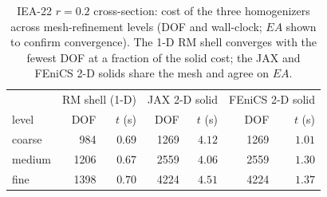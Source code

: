 \begin{table}[t]\centering\small
\caption{IEA-22 $r=0.2$ cross-section: cost of the three homogenizers across mesh-refinement levels (DOF and wall-clock; $EA$ shown to confirm convergence). The 1-D RM shell converges with the fewest DOF at a fraction of the solid cost; the JAX and FEniCS 2-D solids share the mesh and agree on $EA$.}\label{tab:timing}
\setlength{\tabcolsep}{5pt}
\begin{tabular}{l|rr|rr|rr}
\toprule
& \multicolumn{2}{c|}{RM shell (1-D)} & \multicolumn{2}{c|}{JAX 2-D solid} & \multicolumn{2}{c}{FEniCS 2-D solid}\\
level & DOF & $t$ (s) & DOF & $t$ (s) & DOF & $t$ (s)\\
\midrule
coarse & 984 & $0.69$ & 1269 & $4.12$ & 1269 & $1.01$\\
medium & 1206 & $0.67$ & 2559 & $4.06$ & 2559 & $1.30$\\
fine & 1398 & $0.70$ & 4224 & $4.51$ & 4224 & $1.37$\\
\bottomrule
\end{tabular}
\end{table}